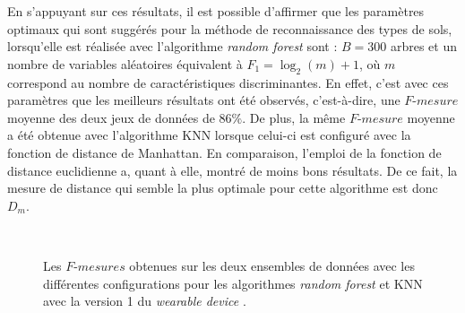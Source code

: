 En s'appuyant sur ces résultats, il est possible d'affirmer que les paramètres optimaux qui sont suggérés pour la méthode de reconnaissance des types de sols, lorsqu'elle est réalisée avec l'algorithme \textit{random forest} sont : $B=300$ arbres et un nombre de variables aléatoires équivalent à $F_1=\log_2(m) + 1$, où $m$ correspond au nombre de caractéristiques discriminantes. En effet, c'est avec ces paramètres que les meilleurs résultats ont été observés, c'est-à-dire, une $F\mbox{-}mesure$ moyenne des deux jeux de données de $86\%$. De plus, la même $F\mbox{-}mesure$ moyenne a été obtenue avec l'algorithme \acs{KNN} lorsque celui-ci est configuré avec la fonction de distance de Manhattan. En comparaison, l'emploi de la fonction de distance euclidienne a, quant à elle, montré de moins bons résultats. De ce fait, la mesure de distance qui semble la plus optimale pour cette algorithme est donc $D_m$.

\begin{figure}[H]
    \centering
    \\[20pt]
    \caption[Les $F\mbox{-} mesures$ obtenues sur les deux ensembles de données avec les différentes configurations pour les algorithmes \textit{random forest} et \acs{KNN} avec la version 1 du \textit{wearable device}.]{Les $F\mbox{-} mesures$ obtenues sur les deux ensembles de données avec les différentes configurations pour les algorithmes \textit{random forest} et \acs{KNN} avec la version 1 du \textit{wearable device} \citep{Thullier2017}.}
    \label{fig:results_wear_v1}
\end{figure}

